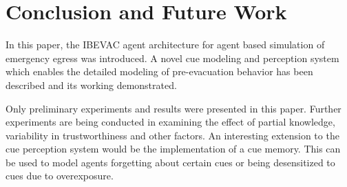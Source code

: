 \section{Conclusion and Future Work}
\label{PreEvac:ConclusionAndFutureWork}

In this paper, the IBEVAC agent architecture for agent based simulation of emergency egress was introduced. A novel cue modeling and perception system which enables the detailed modeling of pre-evacuation behavior has been described and its working demonstrated.

Only preliminary experiments and results were presented in this paper. Further experiments are being conducted in examining the effect of partial knowledge, variability in trustworthiness and other factors. An interesting extension to the cue perception system would be the implementation of a cue memory. This can be used to model agents forgetting about certain cues or being desensitized to cues due to overexposure.